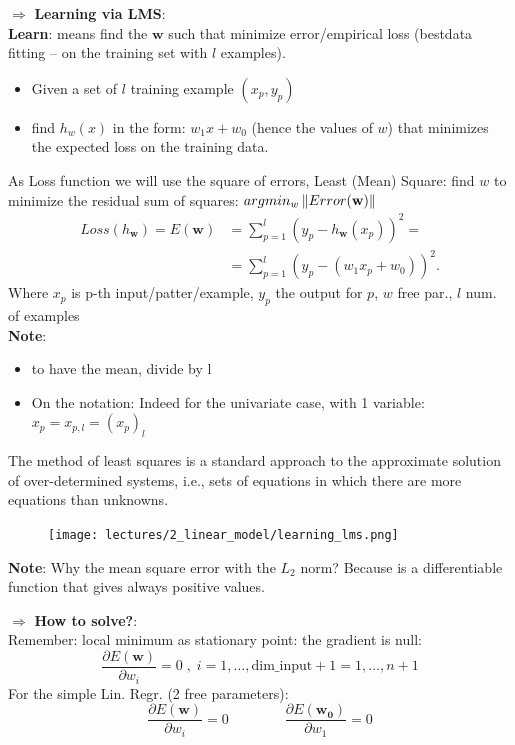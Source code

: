 \documentclass[../main.tex]{subfiles}
\begin{document}
\noindent $\Rightarrow$ \textbf{Learning via LMS}:\\
\textbf{Learn}: means find the $\textbf{w}$ such that minimize error/empirical loss (bestdata fitting – on the training set with $l$ examples).

\begin{itemize}
    \item Given a set of $l$ training example $(x_p, y_p)$
    \item find $h_w(x)$ in the form: $w_1x + w_0$ (hence the values of $w$) that minimizes the expected loss on the training data.
\end{itemize}

As Loss function we will use the square of errors, Least (Mean) Square: find $w$ to minimize the residual sum of squares: $argmin_w \left\lVert Error(\mathbf{w})\right\rVert$ 
\[\begin{aligned}
    Loss(h_\mathbf{w}) = E(\textbf{w}) &= \sum_{p = 1}^{l} (y_p - h_\mathbf{w}(x_p))^2 =\\
                            &=\sum_{p = 1}^{l} (y_p - (w_1x_p + w_0))^2
.\end{aligned}\]
Where $x_p$ is p-th input/patter/example, $y_p$ the output for $p$, $w$ free par., $l$ num. of examples\\

\textbf{Note}: 
\begin{itemize}
    \item to have the mean, divide by l
    \item On the notation: Indeed for the univariate case, with 1 variable: $x_p = x_{p,l} = (x_p)_l$
\end{itemize}
The method of least squares is a standard approach to the approximate solution of over-determined systems, i.e., sets of equations in which there are more equations than unknowns.
\begin{figure}[H]
    \centering
    \texttt{[image: lectures/2\_linear\_model/learning\_lms.png]}
\end{figure}

\textbf{Note}: Why the mean square error with the $L_2$ norm? Because is a differentiable function that gives always positive values.

\noindent $\Rightarrow$ \textbf{How to solve?}:\\
Remember: local minimum as stationary point: the gradient is null:
$$ \frac{\partial E(\mathbf{w})}{\partial{w_i}} = 0 \; , \; i = 1, \dots,  \text{dim\_input}+1 = 1, \dots,  n+1$$
For the simple Lin. Regr. (2 free parameters):
$$ \frac{\partial E(\mathbf{w})}{\partial{w_i}} = 0 \qquad \qquad \frac{\partial E(\mathbf{w_0})}{\partial{w_1}} = 0 $$
\end{document}
